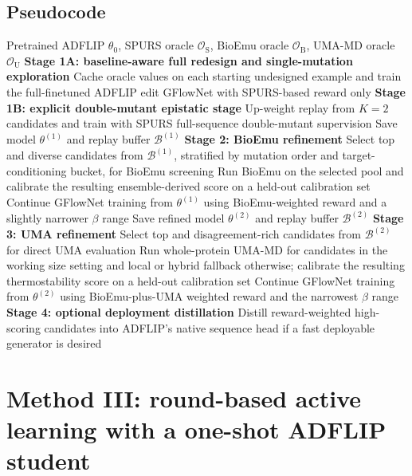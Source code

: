 \documentclass[11pt]{article}
\newcommand{\methodII}{\textsc{Seq-Curr}}
\begin{document}
\subsection{Pseudocode}

\begin{algorithm}[H]
\caption{\methodII{}: sequential curriculum from SPURS exploration to BioEmu and UMA refinement}
\label{alg:method2}
\begin{algorithmic}[1]
\Require Pretrained ADFLIP $\theta_0$, SPURS oracle $\mathcal{O}_{\mathrm S}$, BioEmu oracle $\mathcal{O}_{\mathrm B}$, UMA-MD oracle $\mathcal{O}_{\mathrm U}$
\Statex \textbf{Stage 1A: baseline-aware full redesign and single-mutation exploration}
\State Cache oracle values on each starting undesigned example and train the full-finetuned ADFLIP edit GFlowNet with SPURS-based reward only
\Statex \textbf{Stage 1B: explicit double-mutant epistatic stage}
\State Up-weight replay from $K=2$ candidates and train with SPURS full-sequence double-mutant supervision
\State Save model $\theta^{(1)}$ and replay buffer $\mathcal{B}^{(1)}$
\Statex \textbf{Stage 2: BioEmu refinement}
\State Select top and diverse candidates from $\mathcal{B}^{(1)}$, stratified by mutation order and target-conditioning bucket, for BioEmu screening
\State Run BioEmu on the selected pool and calibrate the resulting ensemble-derived score on a held-out calibration set
\State Continue GFlowNet training from $\theta^{(1)}$ using BioEmu-weighted reward and a slightly narrower $\beta$ range
\State Save refined model $\theta^{(2)}$ and replay buffer $\mathcal{B}^{(2)}$
\Statex \textbf{Stage 3: UMA refinement}
\State Select top and disagreement-rich candidates from $\mathcal{B}^{(2)}$ for direct UMA evaluation
\State Run whole-protein UMA-MD for candidates in the working size setting and local or hybrid fallback otherwise; calibrate the resulting thermostability score on a held-out calibration set
\State Continue GFlowNet training from $\theta^{(2)}$ using BioEmu-plus-UMA weighted reward and the narrowest $\beta$ range
\Statex \textbf{Stage 4: optional deployment distillation}
\State Distill reward-weighted high-scoring candidates into ADFLIP's native sequence head if a fast deployable generator is desired
\end{algorithmic}
\end{algorithm}


\section{Method III: round-based active learning with a one-shot ADFLIP student}
\label{sec:method3}
\end{document}
